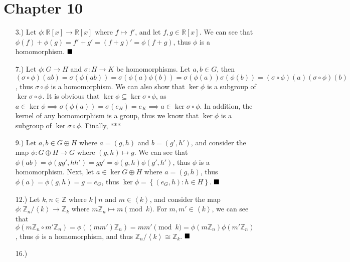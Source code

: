 \documentclass[11pt]{article}
\newcommand{\done}{
    \ensuremath{\strut\hfill\blacksquare}
}
\newcommand{\angleb}[1]{\left\langle#1\right\rangle} %
\newcommand{\braces}[1]{\left\{#1\right\}}           %
\newcommand{\Z}{\mathbb{Z}}
\newcommand{\R}{\mathbb{R}}
\begin{document}
\pagestyle{fancy}
\fancyhead{}

\normalsize

\section*{Chapter 10}
\begin{itemize}
    \item [3.)] Let $\phi:\R[x]\to\R[x]$ where $f\mapsto f'$, and let $f,g\in\R[x]$. We can see that $\phi(f)+\phi(g)=f'+g'=(f+g)'=\phi(f+g)$, thus $\phi$ is a homomorphism. \done

    \item [7.)] Let $\phi:G\to H$ and $\sigma:H\to K$ be homomorphisms. Let $a,b\in G$, then $(\sigma\circ\phi)(ab)=\sigma(\phi(ab))=\sigma(\phi(a)\phi(b))=\sigma(\phi(a))\sigma(\phi(b))=(\sigma\circ\phi)(a)(\sigma\circ\phi)(b)$, thus $\sigma\circ\phi$ is a homomorphism. We can also show that $\ker\phi$ is a subgroup of $\ker\sigma\circ\phi$. It is obvious that $\ker\phi\subseteq\ker\sigma\circ\phi$, as $a\in\ker\phi\implies\sigma(\phi(a))=\sigma(e_H)=e_K\implies a\in\ker\sigma\circ\phi$. In addition, the kernel of any homomorphism is a group, thus we know that $\ker\phi$ is a subgroup of $\ker\sigma\circ\phi$. Finally, ***

    \item [9.)] Let $a,b\in G\oplus H$ where $a=(g,h)$ and $b=(g',h')$, and consider the map $\phi:G\oplus H\to G$ where $(g,h)\mapsto g$. We can see that $\phi(ab)=\phi(gg',hh')=gg'=\phi(g,h)\phi(g',h')$, thus $\phi$ is a homomorphism. Next, let $a\in\ker G\oplus H$ where $a=(g,h)$, thus $\phi(a)=\phi(g,h)=g=e_G$, thus $\ker\phi=\braces{(e_G,h):h\in H}$. \done

    \item [12.)] Let $k,n\in\Z$ where $k\mid n$ and $m\in\angleb{k}$, and consider the map $\phi:\Z_n/\angleb{k}\to\Z_k$ where $m\Z_n\mapsto m\pmod{k}$. For $m,m'\in\angleb{k}$, we can see that $\phi(m\Z_n\circ m'\Z_n)=\phi((mm')\Z_n)=mm'\pmod{k}=\phi(m\Z_n)\phi(m'\Z_n)$, thus $\phi$ is a homomorphism, and thus $\Z_n/\angleb{k}\cong\Z_k$. \done

    \item [16.)]
\end{itemize}
\end{document}
